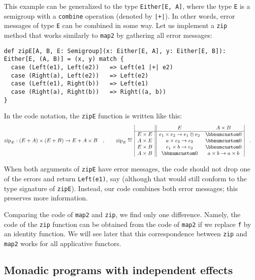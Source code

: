 This example can be generalized to the type \lstinline!Either[E, A]!,
where the type \lstinline!E! is a semigroup with a \lstinline!combine!
operation (denoted by \lstinline!|+|!). In other words, error messages
of type \lstinline!E! can be combined in some way. Let us implement
a \lstinline!zip! method that works similarly to \lstinline!map2!
by gathering all error messages:
\begin{lstlisting}
def zipE[A, B, E: Semigroup](x: Either[E, A], y: Either[E, B]): Either[E, (A, B)] = (x, y) match {
  case (Left(e1), Left(e2))   => Left(e1 |+| e2)
  case (Right(a), Left(e2))   => Left(e2)
  case (Left(e1), Right(b))   => Left(e1)
  case (Right(a), Right(b))   => Right((a, b))
}
\end{lstlisting}
In the code notation, the \lstinline!zipE! function is written like
this:
\[
\text{zip}_{E}:(E+A)\times(E+B)\rightarrow E+A\times B\quad,\quad\quad\text{zip}_{E}\triangleq\,\begin{array}{|c||cc|}
 & E & A\times B\\
\hline E\times E & e_{1}\times e_{2}\rightarrow e_{1}\oplus e_{2} & \bbnum 0\\
A\times E & a\times e_{2}\rightarrow e_{2} & \bbnum 0\\
E\times B & e_{1}\times b\rightarrow e_{2} & \bbnum 0\\
A\times B & \bbnum 0 & a\times b\rightarrow a\times b
\end{array}\quad.
\]

When both arguments of \lstinline!zipE! have error messages, the
code should not drop one of the errors and return \lstinline!Left(e1)!,
say (although that would still conform to the type signature of \lstinline!zipE!).
Instead, our code combines both error messages; this preserves more
information.

Comparing the code of \lstinline!map2! and \lstinline!zip!, we find
only one difference. Namely, the code of the \lstinline!zip! function
can be obtained from the code of \lstinline!map2! if we replace \lstinline!f!
by an identity function. We will see later that this correspondence
between \lstinline!zip! and \lstinline!map2! works for all applicative
functors.

\subsection{Monadic programs with independent effects\label{subsec:Monadic-programs-with-independent-effects-future-applicative}}

